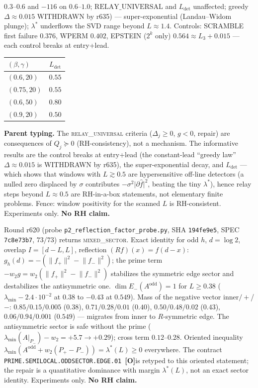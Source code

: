 \documentclass[11pt]{article}
\newcommand{\mO}{\textcolor{openred}{\textbf{[O]}}}
\theoremstyle{definition}
\theoremstyle{remark}
\begin{document}
$0.3$--$0.6$ and $-116$ on $0.6$--$1.0$;
$\mathrm{RELAY\_UNIVERSAL}$ and $L_{\mathrm{det}}$
unaffected; greedy $\Delta\approx 0.015$ WITHDRAWN by r635)
--- super-exponential
(Landau--Widom plunge); $\lambda^*$ underflows the SVD range
beyond $L\approx 1.4$.  Controls: SCRAMBLE first failure $0.376$,
WPERM $0.402$, EPSTEIN ($2^k$ only) $0.564\approx L_3+0.015$
--- each control breaks at entry+lead.
\begin{center}\small
\begin{tabular}{@{}lc@{}}
\toprule
$(\beta,\gamma)$ & $L_{\mathrm{det}}$\\
\midrule
$(0.6,20)$ & $0.55$\\
$(0.75,20)$ & $0.55$\\
$(0.6,50)$ & $0.80$\\
$(0.9,20)$ & $0.50$\\
\bottomrule
\end{tabular}
\end{center}
\textbf{Parent typing.}  The \textsc{relay\_universal} criteria
($\Delta_j\ge 0$, $g<0$, repair) are consequences of
$Q_j\succeq 0$ (RH-consistency), not a mechanism.  The
informative results are the control breaks at entry+lead
(the constant-lead ``greedy law'' $\Delta\approx 0.015$ is
WITHDRAWN by r635), the super-exponential decay, and
$L_{\mathrm{det}}$ --- which
shows that windows with $L\gtrsim 0.5$ are hypersensitive
off-line detectors (a nulled zero displaced by $\sigma$
contributes $-\sigma^2\lvert\partial\hat f\rvert^2$, beating
the tiny $\lambda^*$), hence relay steps beyond $L\approx 0.5$
are RH-in-a-box statements, not elementary finite problems.
Fence: window positivity for the scanned $L$ is RH-consistent.
Experiments only.  \textbf{No RH claim.}

\noindent Round r620 (probe \texttt{p2\_reflection\_factor\_probe.py},
SHA \texttt{194fe9e5}, SPEC \texttt{7c8e73b7}, $73/73$) returns
\textsc{mixed\_sector}.  Exact identity for odd $h$,
$d=\log 2$, overlap $I=[d-L,L]$, reflection
$(Rf)(x)=f(d-x)$:
$g_h(d)=-(\lVert f_+\rVert^2-\lVert f_-\rVert^2)$; the prime
term $-w_2 g=w_2(\lVert f_+\rVert^2-\lVert f_-\rVert^2)$
stabilizes the symmetric edge sector and destabilizes the
antisymmetric one.  $\dim E_-(A^{\mathrm{odd}})=1$ for
$L\ge 0.38$ ($\lambda_{\min}-2.4\cdot 10^{-2}$ at $0.38$ to
$-0.43$ at $0.549$).  Mass of the negative vector
inner$/+$/$-$: $0.85/0.15/0.005$ ($0.38$), $0.71/0.28/0.01$
($0.40$), $0.50/0.48/0.02$ ($0.43$), $0.06/0.94/0.001$
($0.549$) --- migrates from inner to $R$-symmetric edge.  The
antisymmetric sector is safe without the prime
($\lambda_{\min}(A|_{P_-})-w_2=+5.7\to +0.29$); cross term
$0.12$--$0.28$.  Oriented inequality
$\lambda_{\min}(A^{\mathrm{odd}}+w_2(P_+-P_-))=\lambda^*(L)\ge 0$
everywhere.  The contract
\texttt{PRIME.SEMILOCAL.ODDSECTOR.EDGE.01}~\mO is retyped to
this oriented statement; the repair is a quantitative
dominance with margin $\lambda^*(L)$, not an exact sector
identity.  Experiments only.  \textbf{No RH claim.}
\end{document}
